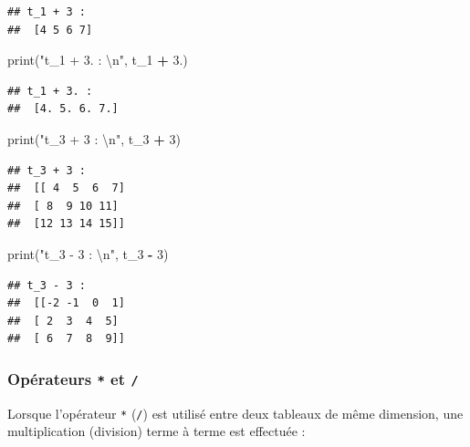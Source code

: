 \documentclass[12pt,]{book}
\newenvironment{Shaded}{\begin{snugshade}}{\end{snugshade}}
\newcommand{\DecValTok}[1]{\textcolor[rgb]{0.00,0.00,0.81}{#1}}
\newcommand{\CharTok}[1]{\textcolor[rgb]{0.31,0.60,0.02}{#1}}
\newcommand{\StringTok}[1]{\textcolor[rgb]{0.31,0.60,0.02}{#1}}
\newcommand{\OperatorTok}[1]{\textcolor[rgb]{0.81,0.36,0.00}{\textbf{#1}}}
\newcommand{\BuiltInTok}[1]{#1}
\newcommand{\NormalTok}[1]{#1}
\numberwithin{equation}{section}
\numberwithin{countremarque}{section}
\begin{document}
\begin{lstlisting}
## t_1 + 3 : 
##  [4 5 6 7]
\end{lstlisting}

\begin{Shaded}
\begin{Highlighting}[]
\BuiltInTok{print}\NormalTok{(}\StringTok{"t_1 + 3. : }\CharTok{\textbackslash{}n}\StringTok{"}\NormalTok{, t_1 }\OperatorTok{+} \DecValTok{3}\NormalTok{.)}
\end{Highlighting}
\end{Shaded}

\begin{lstlisting}
## t_1 + 3. : 
##  [4. 5. 6. 7.]
\end{lstlisting}

\begin{Shaded}
\begin{Highlighting}[]
\BuiltInTok{print}\NormalTok{(}\StringTok{"t_3 + 3 : }\CharTok{\textbackslash{}n}\StringTok{"}\NormalTok{, t_3 }\OperatorTok{+} \DecValTok{3}\NormalTok{)}
\end{Highlighting}
\end{Shaded}

\begin{lstlisting}
## t_3 + 3 : 
##  [[ 4  5  6  7]
##  [ 8  9 10 11]
##  [12 13 14 15]]
\end{lstlisting}

\begin{Shaded}
\begin{Highlighting}[]
\BuiltInTok{print}\NormalTok{(}\StringTok{"t_3 - 3 : }\CharTok{\textbackslash{}n}\StringTok{"}\NormalTok{, t_3 }\OperatorTok{-} \DecValTok{3}\NormalTok{)}
\end{Highlighting}
\end{Shaded}

\begin{lstlisting}
## t_3 - 3 : 
##  [[-2 -1  0  1]
##  [ 2  3  4  5]
##  [ 6  7  8  9]]
\end{lstlisting}

\subsubsection{\texorpdfstring{Opérateurs \texttt{*} et
\texttt{/}}{Opérateurs * et /}}\label{operateurs-et}

Lorsque l'opérateur \texttt{*} (\texttt{/}) est utilisé entre deux
tableaux de même dimension, une multiplication (division) terme à terme
est effectuée :
\end{document}
